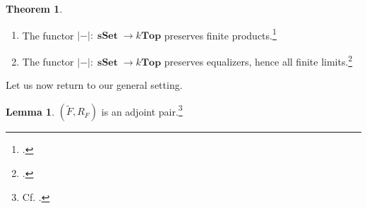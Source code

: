 \documentclass[10pt,letterpaper,cm]{nupset}
\theoremstyle{definition}
\theoremstyle{theorem}
\newtheorem{theorem}[definition]{Theorem}
\newtheorem{lemma}[definition]{Lemma}
\theoremstyle{remark}
\newcommand{\0}{\mathbf{0}}
\newcommand{\1}{\mathbf{1}}
\newcommand{\2}{\mathbf{2}}
\DeclareMathOperator{\sset}{\mathbf{sSet}}
\newcommand{\be}{\begin{enumerate}}
\newcommand{\ee}{\end{enumerate}}
\begin{document}
\begin{theorem}\label{realpres} $ $
\be[label=(\arabic*)]
\item The functor $\left\lvert{-}\right\rvert : \sset \to k\mathbf{Top}$ preserves finite products.\footnote{\cite[Lemma 3.1.8]{Hovey}.}
\item The functor $\left\lvert{-}\right\rvert : \sset \to k\mathbf{Top}$ preserves equalizers, hence all finite limits.\footnote{\cite[Lemma 3.2.4]{Hovey}.}
\ee
\end{theorem}

\medskip

Let us now return to our general setting.

\begin{lemma}
$\left(\widetilde{F}, R_F\right)$ is an adjoint pair.\footnote{Cf.  \cite[Section 4]{Riehl}.}
\end{lemma}
\end{document}

